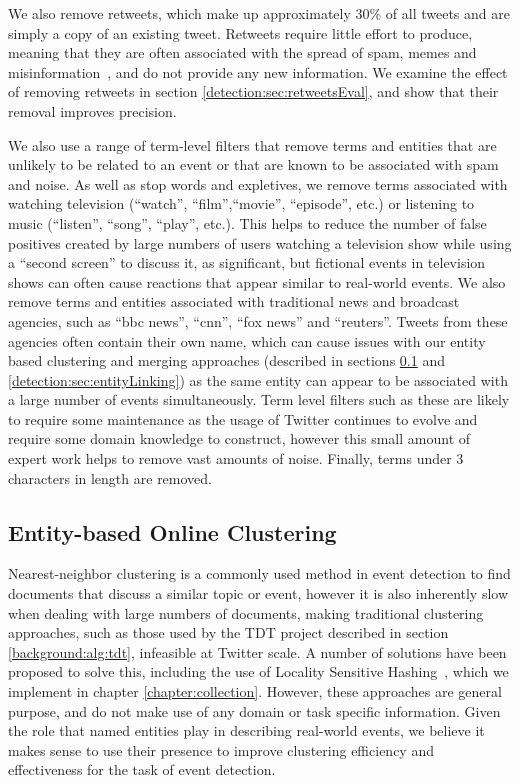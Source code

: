 We also remove retweets, which make up approximately 30\% of all tweets and are simply a copy of an existing tweet.
Retweets require little effort to produce, meaning that they are often associated with the spread of spam, memes and misinformation~\citep{Grier:2010:SUC:1866307.1866311}, and do not provide any new information.
We examine the effect of removing retweets in section \ref{detection:sec:retweetsEval}, and show that their removal improves precision.

We also use a range of term-level filters that remove terms and entities that are unlikely to be related to an event or that are known to be associated with spam and noise.
As well as stop words and expletives, we remove terms associated with watching television (``watch'', ``film'',``movie'', ``episode'', etc.) or listening to music (``listen'', ``song'', ``play'', etc.).
This helps to reduce the number of false positives created by large numbers of users watching a television show while using a ``second screen'' to discuss it, as significant, but fictional events in television shows can often cause reactions that appear similar to real-world events.
We also remove terms and entities associated with traditional news and broadcast agencies, such as ``bbc news'', ``cnn'', ``fox news'' and ``reuters''.
Tweets from these agencies often contain their own name, which can cause issues with our entity based clustering and merging approaches (described in sections \ref{detection:sec:clustering} and \ref{detection:sec:entityLinking}) as the same entity can appear to be associated with a large number of events simultaneously.
Term level filters such as these are likely to require some maintenance as the usage of Twitter continues to evolve and require some domain knowledge to construct, however this small amount of expert work helps to remove vast amounts of noise.
Finally, terms under 3 characters in length are removed.

\subsection{Entity-based Online Clustering}
\label{detection:sec:clustering}
Nearest-neighbor clustering is a commonly used method in event detection to find documents that discuss a similar topic or event, however it is also inherently slow when dealing with large numbers of documents, making traditional clustering approaches, such as those used by the TDT project described in section \ref{background:alg:tdt}, infeasible at Twitter scale.
A number of solutions have been proposed to solve this, including the use of Locality Sensitive Hashing~\citep{Petrovic10}, which we implement in chapter \ref{chapter:collection}.
However, these approaches are general purpose, and do not make use of any domain or task specific information.
Given the role that named entities play in describing real-world events, we believe it makes sense to use their presence to improve clustering efficiency and effectiveness for the task of event detection.

